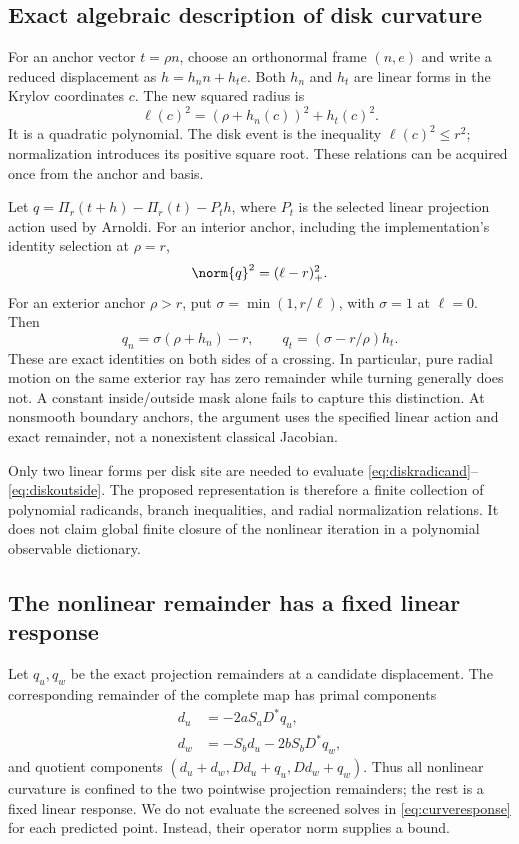 \subsection{Exact algebraic description of disk curvature}
For an anchor vector $t=\rho n$, choose an orthonormal frame $(n,e)$ and
write a reduced displacement as $h=h_n n+h_t e$. Both $h_n$ and $h_t$ are
linear forms in the Krylov coordinates $c$. The new squared radius is
\begin{equation}
 \ell(c)^2=(\rho+h_n(c))^2+h_t(c)^2. \label{eq:diskradicand}
\end{equation}
It is a quadratic polynomial. The disk event is the inequality
$\ell(c)^2\leq r^2$; normalization introduces its positive square root.
These relations can be acquired once from the anchor and basis.

Let $q=\Pi_r(t+h)-\Pi_r(t)-P_t h$, where $P_t$ is the selected linear
projection action used by Arnoldi. For an interior anchor, including the
implementation's identity selection at $\rho=r$,
\begin{equation}
 \norm{q}^2=(\ell-r)_+^2. \label{eq:diskinside}
\end{equation}
For an exterior anchor $\rho>r$, put $\sigma=\min(1,r/\ell)$, with
$\sigma=1$ at $\ell=0$. Then
\begin{equation}
 q_n=\sigma(\rho+h_n)-r,\qquad
 q_t=(\sigma-r/\rho)h_t. \label{eq:diskoutside}
\end{equation}
These are exact identities on both sides of a crossing. In particular,
pure radial motion on the same exterior ray has zero remainder while
turning generally does not. A constant inside/outside mask alone fails to
capture this distinction. At nonsmooth boundary anchors, the argument uses
the specified linear action and exact remainder, not a nonexistent classical
Jacobian.

Only two linear forms per disk site are needed to evaluate
\eqref{eq:diskradicand}--\eqref{eq:diskoutside}. The proposed representation
is therefore a finite collection of polynomial radicands, branch inequalities,
and radial normalization relations. It does not claim global finite closure
of the nonlinear iteration in a polynomial observable dictionary.

\subsection{The nonlinear remainder has a fixed linear response}
Let $q_u,q_w$ be the exact projection remainders at a candidate displacement.
The corresponding remainder of the complete map has primal components
\begin{align}
 d_u&=-2aS_aD^*q_u,\nonumber\\
 d_w&=-S_b d_u-2bS_bD^*q_w,
 \label{eq:curveresponse}
\end{align}
and quotient components
$(d_u+d_w,Dd_u+q_u,Dd_w+q_w)$. Thus all nonlinear curvature is confined
to the two pointwise projection remainders; the rest is a fixed linear
response. We do not evaluate the screened solves in \eqref{eq:curveresponse}
for each predicted point. Instead, their operator norm supplies a bound.

